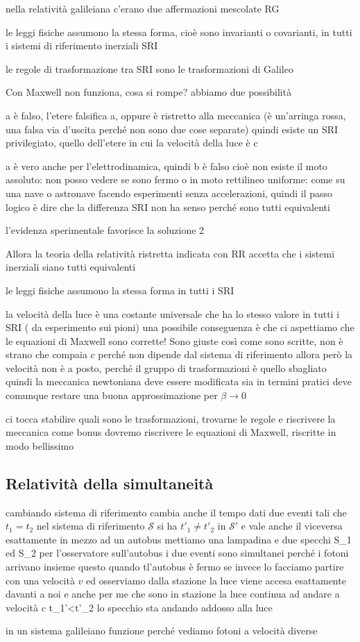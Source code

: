 nella relatività galileiana c'erano due affermazioni mescolate
RG
	\item	 le leggi fisiche assumono la stessa forma, cioè sono invarianti o covarianti, in tutti i sistemi di riferimento inerziali SRI
	\item	 le regole di trasformazione tra SRI sono le trasformazioni di Galileo

Con Maxwell non funziona, cosa si rompe?
abbiamo due possibilità
	\item	a è falso, l'etere falsifica a, oppure è ristretto alla meccanica (è un'arringa rossa, una falsa via d'uscita perché non sono due cose separate)
	quindi esiste un SRI privilegiato, quello dell'etere in cui la velocità della luce è c
	\item	a è vero anche per l'elettrodinamica, quindi b è falso
	cioè non esiste il moto assoluto: non posso vedere se sono fermo o in moto rettilineo uniforme: come su una nave o astronave facendo esperimenti senza accelerazioni, quindi il passo logico è dire che la differenza SRI non ha senso perché sono tutti equivalenti
	
l'evidenza sperimentale favorisce la soluzione 2

Allora la teoria della relatività ristretta indicata con RR accetta che i sistemi inerziali siano tutti equivalenti
	\item	 le leggi fisiche assumono la stessa forma in tutti i SRI
	\item	la velocità della luce è una costante universale che ha lo stesso valore in tutti i SRI ( da esperimento sui pioni)
una possibile conseguenza è che ci aspettiamo che le equazioni di Maxwell sono corrette! Sono giuste così come sono scritte, non è strano che compaia $c$ perché non dipende dal sistema di riferimento
allora però la velocità non è a posto, perché il gruppo di trasformazioni è quello sbagliato
quindi la meccanica newtoniana deve essere modificata sia in termini pratici
deve comunque restare una buona approssimazione per $\beta\rightarrow 0$

ci tocca stabilire quali sono le trasformazioni, trovarne le regole e riscrivere la meccanica
come bonus dovremo riscrivere le equazioni di Maxwell, riscritte in modo bellissimo




\subsection{Relatività della simultaneità}
cambiando sistema di riferimento cambia anche il tempo
dati due eventi tali che $t_1=t_2$ nel sistema di riferimento $\mathcal{S}$ si ha $t'_1\neq t'_2$ in $\mathcal{S}'$ e vale anche il viceversa
esattamente in mezzo ad un autobus mettiamo una lampadina e due specchi S_1 ed S_2
per l'osservatore sull'autobus i due eventi sono simultanei perché i fotoni arrivano insieme
questo quando tl'autobus è fermo
se invece lo facciamo partire con una velocità $v$ ed osserviamo dalla stazione
la luce viene accesa esattamente davanti a noi e anche per me che sono in stazione la luce continua ad andare a velocità $c$
	t_1'<t'_2	lo specchio sta andando addosso alla luce
	
in un sistema galileiano funzione perché vediamo fotoni a velocità diverse











